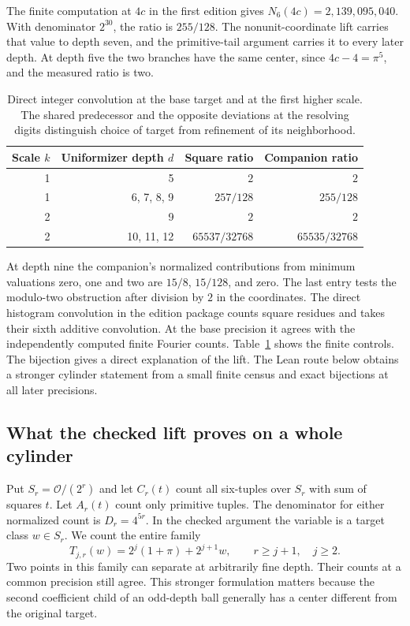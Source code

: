 \documentclass[12pt,letterpaper]{article}
\begin{document}
The finite computation at $4c$ in the first edition gives $N_6(4c)=2{,}139{,}095{,}040$. With denominator $2^{30}$, the ratio is $255/128$. The nonunit-coordinate lift carries that value to depth seven, and the primitive-tail argument carries it to every later depth. At depth five the two branches have the same center, since $4c-4=\pi^5$, and the measured ratio is two.

\begin{table}[htbp]
\centering
\begin{tabular}{@{}r r r r@{}}
\toprule
Scale $k$ & Uniformizer depth $d$ & Square ratio & Companion ratio \\
\midrule
1 & 5 & $2$ & $2$ \\
1 & 6, 7, 8, 9 & $257/128$ & $255/128$ \\
2 & 9 & $2$ & $2$ \\
2 & 10, 11, 12 & $65537/32768$ & $65535/32768$ \\
\bottomrule
\end{tabular}
\caption{Direct integer convolution at the base target and at the first higher scale. The shared predecessor and the opposite deviations at the resolving digits distinguish choice of target from refinement of its neighborhood.}
\label{tab:companion-controls}
\end{table}

At depth nine the companion's normalized contributions from minimum valuations zero, one and two are $15/8$, $15/128$, and zero. The last entry tests the modulo-two obstruction after division by $2$ in the coordinates. The direct histogram convolution in the edition package counts square residues and takes their sixth additive convolution. At the base precision it agrees with the independently computed finite Fourier counts. Table~\ref{tab:companion-controls} shows the finite controls. The bijection gives a direct explanation of the lift. The Lean route below obtains a stronger cylinder statement from a small finite census and exact bijections at all later precisions.


\subsection{What the checked lift proves on a whole cylinder}

Put $S_r=\mathcal O/(2^r)$ and let $C_r(t)$ count all six-tuples over $S_r$ with sum of squares $t$. Let $A_r(t)$ count only primitive tuples. The denominator for either normalized count is $D_r=4^{5r}$. In the checked argument the variable is a target class $w\in S_r$. We count the entire family
\[
T_{j,r}(w)=2^j(1+\pi)+2^{j+1}w,
\qquad r\geq j+1,\quad j\geq2.
\]
Two points in this family can separate at arbitrarily fine depth. Their counts at a common precision still agree. This stronger formulation matters because the second coefficient child of an odd-depth ball generally has a center different from the original target.
\end{document}
